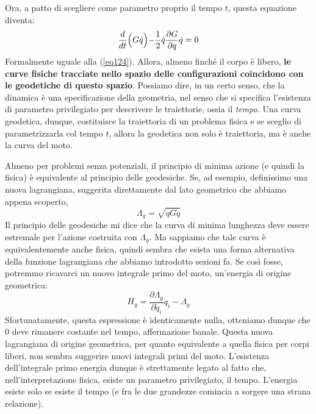 \documentclass[a4paper,openany]{article}
\begin{document}
Ora, a patto di scegliere come parametro proprio il tempo $t$, questa equazione diventa:
\begin{equation}\label{key}\dfrac{d}{dt}\Bigl(G\dot{q}\Bigl)-\dfrac{1}{2}\dot{q}\dfrac{\partial G}{\partial q}\dot{q} =0
\end{equation}
Formalmente uguale alla (\ref{eq124}). Allora, almeno finché il corpo è libero, \textbf{le curve fisiche tracciate nello spazio delle configurazioni coincidono con le geodetiche di questo spazio}. Possiamo dire, in un certo senso, che la dinamica è una specificazione della geometria, nel senso che si specifica l'esistenza di parametro privilegiato per descrivere le traiettorie, ossia il \textit{tempo}. Una curva geodetica, dunque, costituisce la traiettoria di un problema fisica e se sceglio di parametrizzarla col tempo $t$, allora la geodetica non solo è traiettoria, ma è anche la curva del moto.
	
	
	Almeno per problemi senza potenziali, il principio di minima azione (e quindi la fisica) è equivalente al principio delle geodesiche. Se, ad esempio, definissimo una nuova lagrangiana, suggerita direttamente dal lato geometrico che abbiamo appena scoperto,
	\begin{equation}\label{key}
		\Lambda_{g} = \sqrt{\dot{q}G\dot{q}}
	\end{equation}
	Il principio delle geodesiche mi dice che la curva di minima lunghezza deve essere estremale per l'azione costruita con $\Lambda_g$. Ma sappiamo che tale curva è equivalentemente anche fisica, quindi sembra che esista una forma alternativa della funzione lagrangiana che abbiamo introdotto sezioni fa. Se così fosse, potremmo ricavarci un nuovo integrale primo del moto, un'energia di origine geometrica:
	\begin{equation}\label{key}
		H_{g} = \dfrac{\partial \Lambda_g}{\partial \dot{q}_i}\dot{q}_i - \Lambda_g
	\end{equation}
	Sfortunatamente, questa espressione è identicamente nulla, otteniamo dunque che $0$ deve rimanere costante nel tempo, affermazione banale. Questa nuova lagrangiana di origine geometrica, per quanto equivalente a quella fisica per corpi liberi, non sembra suggerire nuovi integrali primi del moto. L'esistenza dell'integrale primo energia dunque è strettamente legato al fatto che, nell'interpretazione fisica, esiste un parametro privilegiato, il tempo. L'energia esiste solo se esiste il tempo (e fra le due grandezze comincia a sorgere una strana relazione).
\end{document}

